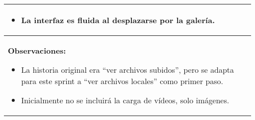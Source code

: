 \begin{table}[H]
\begin{tabularx}{\textwidth}{|l|X|l|}
{\begin{itemize}
                \item La interfaz es fluida al desplazarse por la galería.
            \end{itemize}
        }\\
        \hline
        \multicolumn{3}{|p{\textwidth}|}{
            \textbf{Observaciones:}
            \begin{itemize}
                \item La historia original era ``ver archivos subidos'', pero se adapta para este sprint a ``ver archivos locales'' como primer paso.
                \item Inicialmente no se incluirá la carga de vídeos, solo imágenes.
            \end{itemize}
        }\\
        \hline
    \end{tabularx}
\end{table}

